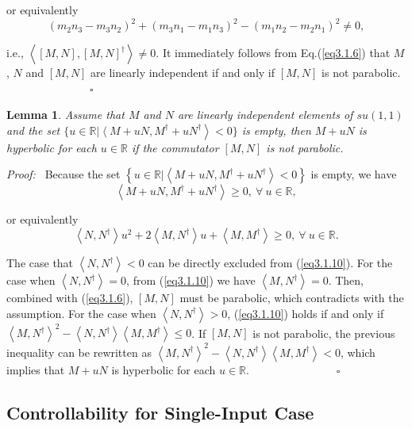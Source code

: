 \documentclass[onecolumn,showpacs,showkeys,preprintnumbers]{revtex4}
\newtheorem{lemma}[theorem]{Lemma}
\begin{document}
\noindent or equivalently\noindent\begin{equation}\label{eq3.1.8}
(m_2n_3-m_3n_2)^2+(m_3n_1-m_1n_3)^2-(m_1n_2-m_2n_1)^2\neq0,
\end{equation}

\noindent i.e., $\left<[M,N],[M,N]^\dag\right>\neq0$. It
immediately follows from Eq.(\ref{eq3.1.6}) that $M$, $N$ and
$[M,N]$ are linearly independent if and only if $[M,N]$ is not
parabolic. ~~~~~~~~~~~~~~~$\square$

\noindent\begin{lemma}\label{lemma3.1.3}Assume that $M$ and $N$ are linearly independent elements of
$su(1,1)$ and the set
$\{u\in\mathbb{R}|\left<M\right.+uN,M^{\dag}+\left.uN^{\dag}\right><0\}$
is empty, then $M+uN$ is hyperbolic for each $u\in\mathbb{R}$ if
the commutator $[M,N]$ is not parabolic.
\end{lemma}

{\it{Proof:~}} Because the set
$\left\{u\in\mathbb{R}|\left<M+uN,M^{\dag}+uN^{\dag}\right><0\right\}$
is empty, we have\noindent\begin{equation}\label{eq3.1.9}
\left<M+uN,M^{\dag}+uN^{\dag}\right>\geq0,~\forall~u\in\mathbb{R},
\end{equation}

\noindent or equivalently\noindent\begin{equation}\label{eq3.1.10}
\left<N,N^{\dag}\right>u^2+2\left<M,N^{\dag}\right>u+\left<M,M^{\dag}\right>\geq0,~\forall~u\in\mathbb{R}.
\end{equation}

\noindent The case that $\left<N,N^{\dag}\right><0$ can be
directly excluded from (\ref{eq3.1.10}). For the case when
$\left<N,N^{\dag}\right>=0$, from (\ref{eq3.1.10}) we have
$\left<M,N^{\dag}\right>=0$. Then, combined with (\ref{eq3.1.6}),
$[M,N]$ must be parabolic, which contradicts with the assumption.
For the case when $\left<N,N^{\dag}\right>>0$, (\ref{eq3.1.10})
holds if and only if
$\left<M,N^{\dag}\right>^2-\left<N,N^{\dag}\right>\left<M,M^{\dag}\right>\leq0$.
If $[M,N]$ is not parabolic, the previous inequality can be
rewritten as
$\left<M,N^{\dag}\right>^2-\left<N,N^{\dag}\right>\left<M,M^{\dag}\right><0$,
which implies that $M+uN$ is hyperbolic for each $u\in\mathbb{R}$.
~~~~~~~~~~~~~~~$\square$

\subsection{Controllability for Single-Input
Case}\label{sec3.2}
\end{document}
